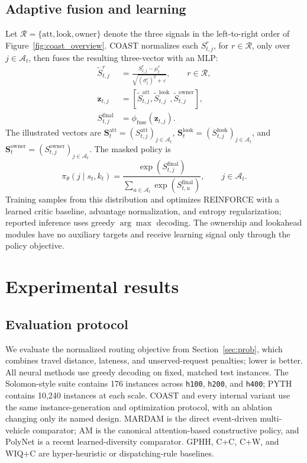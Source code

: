 \documentclass[letterpaper]{article}
\begin{document}
\subsection{Adaptive fusion and learning}

Let $\mathcal R=\{\mathrm{att},\mathrm{look},\mathrm{owner}\}$ denote the three signals in the left-to-right order of Figure~\ref{fig:coast_overview}. COAST normalizes each $S_{t,j}^{r}$, for $r\in\mathcal R$, only over $j\in\mathcal A_t$, then fuses the resulting three-vector with an MLP:
\[
\begin{aligned}
\widetilde S_{t,j}^{r}&=\frac{S_{t,j}^{r}-\mu_t^{r}}
{\sqrt{(\sigma_t^{r})^2+\varepsilon}},\qquad r\in\mathcal R,\\
\mathbf z_{t,j}&=[\widetilde S_{t,j}^{\mathrm{att}},
\widetilde S_{t,j}^{\mathrm{look}},\widetilde S_{t,j}^{\mathrm{owner}}],\\
S_{t,j}^{\mathrm{final}}&=\phi_{\mathrm{fuse}}(\mathbf z_{t,j}).
\end{aligned}
\]
The illustrated vectors are $\mathbf S_t^{\mathrm{att}}=(S_{t,j}^{\mathrm{att}})_{j\in\mathcal A_t}$, $\mathbf S_t^{\mathrm{look}}=(S_{t,j}^{\mathrm{look}})_{j\in\mathcal A_t}$, and $\mathbf S_t^{\mathrm{owner}}=(S_{t,j}^{\mathrm{owner}})_{j\in\mathcal A_t}$. The masked policy is
\[
\pi_\theta(j\mid s_t,k_t)=
\frac{\exp(S_{t,j}^{\mathrm{final}})}
{\sum_{u\in\mathcal A_t}\exp(S_{t,u}^{\mathrm{final}})},\qquad j\in\mathcal A_t.
\]
Training samples from this distribution and optimizes REINFORCE with a learned critic baseline, advantage normalization, and entropy regularization; reported inference uses greedy $\arg\max$ decoding. The ownership and lookahead modules have no auxiliary targets and receive learning signal only through the policy objective.

\section{Experimental results} \label{sec:experiment}

\subsection{Evaluation protocol}

We evaluate the normalized routing objective from Section~\ref{sec:prob}, which combines travel distance, lateness, and unserved-request penalties; lower is better. All neural methods use greedy decoding on fixed, matched test instances. The Solomon-style suite contains 176 instances across \texttt{h100}, \texttt{h200}, and \texttt{h400}; PYTH contains 10,240 instances at each scale. COAST and every internal variant use the same instance-generation and optimization protocol, with an ablation changing only its named design. MARDAM \cite{bono2021mardam} is the direct event-driven multi-vehicle comparator; AM \cite{kool2019attention} is the canonical attention-based constructive policy, and PolyNet \cite{hottung2025polynet} is a recent learned-diversity comparator. GPHH, C+C, C+W, and WIQ+C are hyper-heuristic or dispatching-rule baselines.
\end{document}
